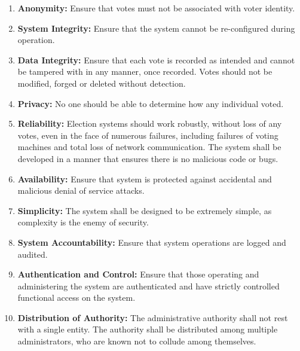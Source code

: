 \begin{enumerate}
	\item \textbf{Anonymity:} Ensure that votes must not be associated with voter identity.
	
	\item \textbf{System Integrity:} Ensure that the system cannot be re-configured during operation.
	
	\item \textbf{Data Integrity:} Ensure that each vote is recorded as intended and cannot be tampered with in any manner, once recorded. Votes should not be modified, forged or deleted without detection.
	
	\item \textbf{Privacy:} No one should be able to determine how any individual voted.
	
	\item \textbf{Reliability:} Election systems should work robustly, without loss of any votes, even in the face of numerous failures, including failures of voting machines and total loss of network communication. The system shall be developed in a manner that ensures there is no malicious code or bugs.
	
	\item \textbf{Availability:} Ensure that system is protected against accidental and malicious denial of service attacks.
	
	\item \textbf{Simplicity:} The system shall be designed to be extremely simple, as complexity is the enemy of security.
	
	\item \textbf{System Accountability:} Ensure that system operations are logged and audited.
	
	\item \textbf{Authentication and Control:} Ensure that those operating and administering the system are authenticated and have strictly controlled functional access on the system.
	
	\item \textbf{Distribution of Authority:} The administrative authority shall not rest with a single entity. The authority shall be distributed among multiple administrators, who are known not to collude among themselves.
\end{enumerate}

